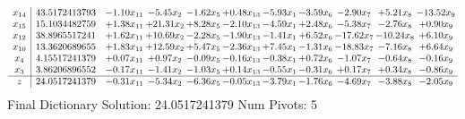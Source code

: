 \documentclass[9pt]{article}
\begin{document}
 \[\begin{array}{c| c c@{\hskip 2pt} c@{\hskip 2pt} c@{\hskip 2pt} c@{\hskip 2pt} c@{\hskip 2pt} c@{\hskip 2pt} c@{\hskip 2pt} c@{\hskip 2pt} c@{\hskip 2pt} }
 x_{14}   &  43.5172413793 & -1.10 x_{11} & -5.45 x_{2} & -1.62 x_{5} & +  0.48 x_{13} & -5.93 x_{1} & -3.59 x_{6} & -2.90 x_{7} & +  5.21 x_{8} & -13.52 x_{9}\\
 x_{15}   &  15.1034482759 & +  1.38 x_{11} & + 21.31 x_{2} & +  8.28 x_{5} & -2.10 x_{13} & -4.59 x_{1} & +  2.48 x_{6} & -5.38 x_{7} & -2.76 x_{8} & +  0.90 x_{9}\\
 x_{12}   &  38.8965517241 & +  1.62 x_{11} & + 10.69 x_{2} & -2.28 x_{5} & -1.90 x_{13} & -1.41 x_{1} & +  6.52 x_{6} & -17.62 x_{7} & -10.24 x_{8} & +  6.10 x_{9}\\
 x_{10}   &  13.3620689655 & +  1.83 x_{11} & + 12.59 x_{2} & +  5.47 x_{5} & -2.36 x_{13} & +  7.45 x_{1} & -1.31 x_{6} & -18.83 x_{7} & -7.16 x_{8} & +  6.64 x_{9}\\
 x_{4}   &  4.15517241379 & +  0.07 x_{11} & +  0.97 x_{2} & -0.09 x_{5} & -0.16 x_{13} & -0.38 x_{1} & +  0.72 x_{6} & -1.07 x_{7} & -0.64 x_{8} & -0.16 x_{9}\\
 x_{3}   &  3.86206896552 & -0.17 x_{11} & -1.41 x_{2} & -1.03 x_{5} & +  0.14 x_{13} & -0.55 x_{1} & -0.31 x_{6} & +  0.17 x_{7} & +  0.34 x_{8} & -0.86 x_{9}\\
\hline
z    &  24.0517241379 & -0.31 x_{11} & -5.34 x_{2} & -6.36 x_{5} & -0.05 x_{13} & -3.79 x_{1} & -1.76 x_{6} & -4.69 x_{7} & -3.88 x_{8} & -2.05 x_{9}\\
\end{array}\]
Final Dictionary
Solution:  24.0517241379
Num Pivots:  5
\end{document}
